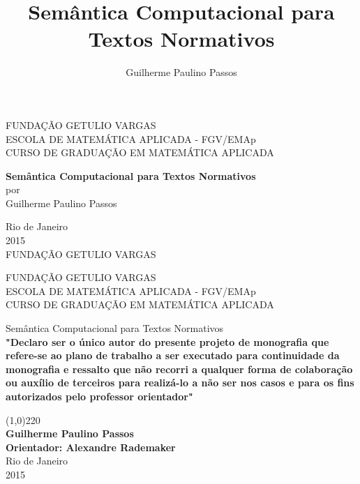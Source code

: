 \documentclass[12pt, a4paper, twoside]{article}
\title{Semântica Computacional para Textos Normativos} \newcommand{\usetitle}{Semântica Computacional para Textos Normativos}
\author{Guilherme Paulino Passos} \newcommand{\useauthor}{\Guilherme Paulino Passos}
\newcommand{\supervisor}{Alexandre Rademaker}
\begin{document}
\begin{titlepage}
 \begin{center}
  { \large FUNDAÇÃO GETULIO VARGAS}\\[0.3cm]
  { \large ESCOLA DE MATEMÁTICA APLICADA - FGV/EMAp}\\[0.5cm]
  { \large CURSO DE GRADUAÇÃO EM MATEMÁTICA APLICADA}\\[0.3cm]
 
  \vspace{55 mm}

  {\bf \large Semântica Computacional para Textos Normativos}\\[1.2cm]

  { por}\\[0.6cm]
  {\large Guilherme Paulino Passos}\\[0.1cm]


  \vspace{7cm}

  { Rio de Janeiro}\\[0.1cm]
  { 2015}\\[0.6cm]
  { FUNDAÇÃO GETULIO VARGAS}\\[0.1cm]
 \end{center}
\end{titlepage}

\begin{titlepage}
 
 \begin{center}
  {\large FUNDAÇÃO GETULIO VARGAS}\\[0.3cm]
  {\large ESCOLA DE MATEMÁTICA APLICADA - FGV/EMAp}\\[0.5cm]
  {\large CURSO DE GRADUAÇÃO EM MATEMÁTICA APLICADA}\\[0.3cm]


  \vspace{20 mm}


  {\large Semântica Computacional para Textos Normativos}\\[2.1cm]

  
  \bf "Declaro ser o único autor do presente projeto de monografia que refere-se ao
plano de trabalho a ser executado para continuidade da monografia e ressalto
que não recorri a qualquer forma de colaboração ou auxílio de terceiros para
realizá-lo a não ser nos casos e para os fins autorizados pelo professor orientador"

  \vspace{3.5cm}
  
  \line(1,0){220}\\[0.1cm]
  {\bf Guilherme Paulino Passos}\\[2cm]
  {\bf Orientador: \supervisor}\\[3cm]


  {Rio de Janeiro}\\[0.1cm]
  {2015}
 \end{center}
\end{titlepage}
\end{document}
